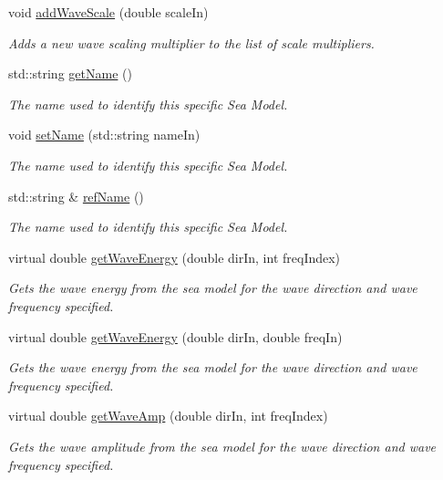 \begin{DoxyCompactItemize}
void \hyperlink{classosea_1_1_sea_model_afb962419b075fb460ce38d7fe3463bc5}{add\-Wave\-Scale} (double scale\-In)
\begin{DoxyCompactList}\small\item\em Adds a new wave scaling multiplier to the list of scale multipliers. \end{DoxyCompactList}\item 
std\-::string \hyperlink{classosea_1_1_sea_model_a5a8408636c26e765fd85d080cb8cd7f9}{get\-Name} ()
\begin{DoxyCompactList}\small\item\em The name used to identify this specific Sea Model. \end{DoxyCompactList}\item 
void \hyperlink{classosea_1_1_sea_model_a539f1d817d847f0e377ddd2d636eeaa3}{set\-Name} (std\-::string name\-In)
\begin{DoxyCompactList}\small\item\em The name used to identify this specific Sea Model. \end{DoxyCompactList}\item 
std\-::string \& \hyperlink{classosea_1_1_sea_model_a5787d020db9852b79e73d8e0a38c824d}{ref\-Name} ()
\begin{DoxyCompactList}\small\item\em The name used to identify this specific Sea Model. \end{DoxyCompactList}\item 
virtual double \hyperlink{classosea_1_1_sea_model_acea132fcb4f8d447b41725ecfd0a6e1b}{get\-Wave\-Energy} (double dir\-In, int freq\-Index)
\begin{DoxyCompactList}\small\item\em Gets the wave energy from the sea model for the wave direction and wave frequency specified. \end{DoxyCompactList}\item 
virtual double \hyperlink{classosea_1_1_sea_model_abd444caa08206c2f3b2002e614f0b2fc}{get\-Wave\-Energy} (double dir\-In, double freq\-In)
\begin{DoxyCompactList}\small\item\em Gets the wave energy from the sea model for the wave direction and wave frequency specified. \end{DoxyCompactList}\item 
virtual double \hyperlink{classosea_1_1_sea_model_ab1315af8b1038a3a7458de2990c8f79d}{get\-Wave\-Amp} (double dir\-In, int freq\-Index)
\begin{DoxyCompactList}\small\item\em Gets the wave amplitude from the sea model for the wave direction and wave frequency specified. \end{DoxyCompactList}\end{DoxyCompactItemize}
